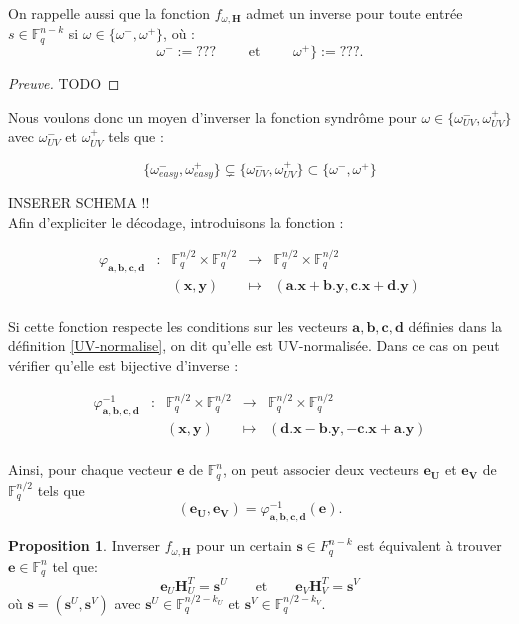 \documentclass[12pt]{article}
\theoremstyle{definition}
\newtheorem{propo}[thm]{Proposition}
\newcommand{\F}{\mathbb{F}}
\begin{document}
On rappelle aussi que la fonction $f_{\omega,\mathbf{H}}$ admet un inverse pour toute entrée $s \in \F_q^{n-k}$ si $\omega \in \{\omega^-,\omega^+\}$, où :
$$ \omega^- := ??? \qquad \text{ et }\qquad  \omega^+\} := ???.$$

\begin{proof}[Preuve] TODO
\end{proof}


Nous voulons donc un moyen d'inverser la fonction syndrôme pour $\omega \in \{\omega_{UV}^-,\omega_{UV}^+\}$ avec $\omega_{UV}^-$ et $\omega_{UV}^+$ tels que :

$$\{\omega_{easy}^-,\omega_{easy}^+\} \subsetneq \{\omega_{UV}^-,\omega_{UV}^+\} \subset  \{\omega^-,\omega^+\}$$

INSERER SCHEMA !! \\

Afin d'expliciter le décodage, introduisons la fonction :

$$\begin{array}{ccccc}
\varphi_{\mathbf{a},\mathbf{b},\mathbf{c},\mathbf{d}} & : & \F_q^{n/2} \times  \F_q^{n/2} & \to & \F_q^{n/2} \times  \F_q^{n/2} \\
 & & (\mathbf{x} , \mathbf{y}) & \mapsto &  (\mathbf{a}.\mathbf{x} + \mathbf{b}.\mathbf{y}, \mathbf{c}.\mathbf{x} + \mathbf{d}.\mathbf{y}) \\
\end{array}$$

Si cette fonction respecte les conditions sur les vecteurs $\mathbf{a},\mathbf{b},\mathbf{c},\mathbf{d}$ définies dans la définition \ref{UV-normalise}, on dit qu'elle est UV-normalisée. Dans ce cas on peut vérifier qu'elle est bijective d'inverse :

$$\begin{array}{ccccc}
\varphi^{-1}_{\mathbf{a},\mathbf{b},\mathbf{c},\mathbf{d}} & : & \F_q^{n/2} \times  \F_q^{n/2} & \to & \F_q^{n/2} \times  \F_q^{n/2} \\
 & & (\mathbf{x} , \mathbf{y}) & \mapsto &  (\mathbf{d}.\mathbf{x} - \mathbf{b}.\mathbf{y}, -\mathbf{c}.\mathbf{x} + \mathbf{a}.\mathbf{y}) \\
\end{array}$$

Ainsi, pour chaque vecteur $\mathbf{e}$ de $\F_q^n$, on peut associer deux vecteurs $\mathbf{e_U}$ et $\mathbf{e_V}$ de $\F_q^{n/2}$ tels que 
$$ (\mathbf{e_U},\mathbf{e_V}) = \varphi^{-1}_{\mathbf{a},\mathbf{b},\mathbf{c},\mathbf{d}}(\mathbf{e}).$$

\begin{propo} Inverser $f_{\omega,\mathbf{H}}$ pour un certain $\mathbf{s} \in F_q^{n-k}$ est équivalent à trouver $\mathbf{e} \in \F_q^n$ tel que:
$$ \mathbf{e}_U\mathbf{H}_U^T = \mathbf{s}^U \qquad \text{et} \qquad \mathbf{e}_V\mathbf{H}_V^T = \mathbf{s}^V $$
où $\mathbf{s} = (\mathbf{s}^U, \mathbf{s}^V)$ avec $\mathbf{s}^U \in \F_q^{n/2-k_U}$ et $\mathbf{s}^V \in \F_q^{n/2-k_V}$.
\end{propo}
\end{document}
